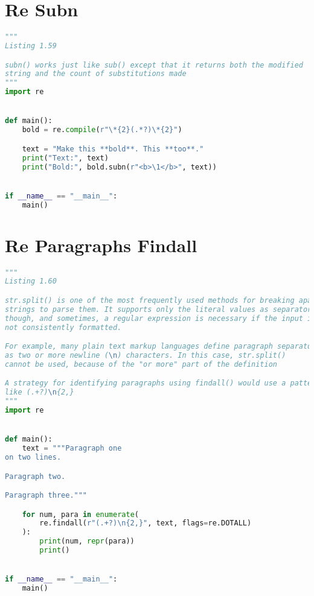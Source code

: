 \documentclass[a4paper,landscape]{report}
\begin{document}
\section{Re Subn}
\begin{lstlisting}[language=Python]
"""
Listing 1.59

subn() works just like sub() except that it returns both the modified
string and the count of substitutions made
"""
import re


def main():
    bold = re.compile(r"\*{2}(.*?)\*{2}")

    text = "Make this **bold**. This **too**."
    print("Text:", text)
    print("Bold:", bold.subn(r"<b>\1</b>", text))


if __name__ == "__main__":
    main()

\end{lstlisting}
\section{Re Paragraphs Findall}
\begin{lstlisting}[language=Python]
"""
Listing 1.60

str.split() is one of the most frequently used methods for breaking apart
strings to parse them. It supports only the literal values as separators,
though, and sometimes, a regular expression is necessary if the input is
not consistently formatted.

For example, many plain text markup languages define paragraph separators
as two or more newline (\n) characters. In this case, str.split()
cannot be used, because of the "or more" part of the definition

A strategy for identifying paragraphs using findall() would use a pattern
like (.+?)\n{2,}
"""
import re


def main():
    text = """Paragraph one
on two lines.

Paragraph two.

Paragraph three."""

    for num, para in enumerate(
        re.findall(r"(.+?)\n{2,}", text, flags=re.DOTALL)
    ):
        print(num, repr(para))
        print()


if __name__ == "__main__":
    main()

\end{lstlisting}
\end{document}
